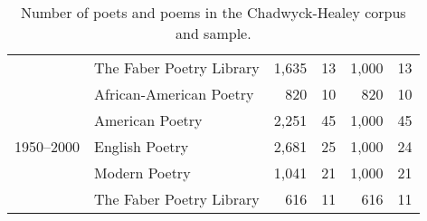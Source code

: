 \begin{table}[t]
{\begin{tabular}{llrrrr}
   & The Faber Poetry Library & 1,635 & 13 & 1,000 & 13 \\
  \cline{1-6}
  \multirow[t]{5}{*}{1950--2000} & African-American Poetry & 820 & 10 & 820 & 10 \\
   & American Poetry & 2,251 & 45 & 1,000 & 45 \\
   & English Poetry & 2,681 & 25 & 1,000 & 24 \\
   & Modern Poetry & 1,041 & 21 & 1,000 & 21 \\
   & The Faber Poetry Library & 616 & 11 & 616 & 11 \\
  \bottomrule
  \end{tabular}
  }
  \caption{Number of poets and poems in the Chadwyck-Healey corpus and sample.}
  \label{tab:num_poems_corpus}
\end{table}